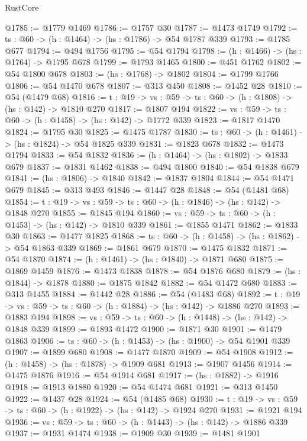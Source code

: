 \begin{lexlean}{RustCore}
\begin{coremodule}
@1785 := @1779 @1469
@1786 := @1757 @30
@1787 := @1473 @1749
@1792 := {ts : @60} -> (h : @1464) -> (hs : @1786) -> @54 @1787 @339
@1793 := @1785 @677
@1794 := @494 @1756
@1795 := @54 @1794
@1798 := (h : @1466) -> (hs : @1764) -> @1795 @678
@1799 := @1793 @1465
@1800 := @451 @1762
@1802 := @54 @1800 @678
@1803 := (hs : @1768) -> @1802
@1804 := @1799 @1766
@1806 := @54 @1470 @678
@1807 := @313 @450
@1808 := @1452 @28
@1810 := @54 (@1479 @68)
@1816 := {t : @19} -> {vs : @59} -> {ts : @60} -> (h : @1808) -> (hs : @142) -> @1810 @270
@1817 := @1807 @194
@1822 := {vs : @59} -> {ts : @60} -> (h : @1458) -> (hs : @142) -> @1772 @339
@1823 := @1817 @1470
@1824 := @1795 @30
@1825 := @1475 @1787
@1830 := {ts : @60} -> (h : @1461) -> (hs : @1824) -> @54 @1825 @339
@1831 := @1823 @678
@1832 := @1473 @1794
@1833 := @54 @1832
@1836 := (h : @1464) -> (hs : @1802) -> @1833 @679
@1837 := @1831 @1462
@1838 := @494 @1800
@1840 := @54 @1838 @679
@1841 := (hs : @1806) -> @1840
@1842 := @1837 @1804
@1844 := @54 @1471 @679
@1845 := @313 @493
@1846 := @1447 @28
@1848 := @54 (@1481 @68)
@1854 := {t : @19} -> {vs : @59} -> {ts : @60} -> (h : @1846) -> (hs : @142) -> @1848 @270
@1855 := @1845 @194
@1860 := {vs : @59} -> {ts : @60} -> (h : @1453) -> (hs : @142) -> @1810 @339
@1861 := @1855 @1471
@1862 := @1833 @30
@1863 := @1477 @1825
@1868 := {ts : @60} -> (h : @1458) -> (hs : @1862) -> @54 @1863 @339
@1869 := @1861 @679
@1870 := @1475 @1832
@1871 := @54 @1870
@1874 := (h : @1461) -> (hs : @1840) -> @1871 @680
@1875 := @1869 @1459
@1876 := @1473 @1838
@1878 := @54 @1876 @680
@1879 := (hs : @1844) -> @1878
@1880 := @1875 @1842
@1882 := @54 @1472 @680
@1883 := @313 @1455
@1884 := @1442 @28
@1886 := @54 (@1483 @68)
@1892 := {t : @19} -> {vs : @59} -> {ts : @60} -> (h : @1884) -> (hs : @142) -> @1886 @270
@1893 := @1883 @194
@1898 := {vs : @59} -> {ts : @60} -> (h : @1448) -> (hs : @142) -> @1848 @339
@1899 := @1893 @1472
@1900 := @1871 @30
@1901 := @1479 @1863
@1906 := {ts : @60} -> (h : @1453) -> (hs : @1900) -> @54 @1901 @339
@1907 := @1899 @680
@1908 := @1477 @1870
@1909 := @54 @1908
@1912 := (h : @1458) -> (hs : @1878) -> @1909 @681
@1913 := @1907 @1456
@1914 := @1475 @1876
@1916 := @54 @1914 @681
@1917 := (hs : @1882) -> @1916
@1918 := @1913 @1880
@1920 := @54 @1474 @681
@1921 := @313 @1450
@1922 := @1437 @28
@1924 := @54 (@1485 @68)
@1930 := {t : @19} -> {vs : @59} -> {ts : @60} -> (h : @1922) -> (hs : @142) -> @1924 @270
@1931 := @1921 @194
@1936 := {vs : @59} -> {ts : @60} -> (h : @1443) -> (hs : @142) -> @1886 @339
@1937 := @1931 @1474
@1938 := @1909 @30
@1939 := @1481 @1901

\end{coremodule}
\end{lexlean}
